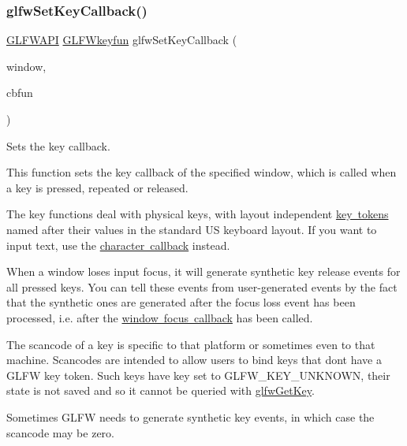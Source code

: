 \subsubsection{\texorpdfstring{glfwSetKeyCallback()}{glfwSetKeyCallback()}}
{\footnotesize\ttfamily \mbox{\hyperlink{glfw3_8h_a56da5036b2cc259351ae22fd6439bb47}{G\+L\+F\+W\+A\+PI}} \mbox{\hyperlink{group__input_ga0192a232a41e4e82948217c8ba94fdfd}{G\+L\+F\+Wkeyfun}} glfw\+Set\+Key\+Callback (\begin{DoxyParamCaption}\item[{\mbox{\hyperlink{group__window_ga3c96d80d363e67d13a41b5d1821f3242}{G\+L\+F\+Wwindow}} $\ast$}]{window,  }\item[{\mbox{\hyperlink{group__input_ga0192a232a41e4e82948217c8ba94fdfd}{G\+L\+F\+Wkeyfun}}}]{cbfun }\end{DoxyParamCaption})}



Sets the key callback. 

This function sets the key callback of the specified window, which is called when a key is pressed, repeated or released.

The key functions deal with physical keys, with layout independent \mbox{\hyperlink{group__keys}{key tokens}} named after their values in the standard US keyboard layout. If you want to input text, use the \mbox{\hyperlink{group__input_ga07b2959b23dc3e466ce7475746021002}{character callback}} instead.

When a window loses input focus, it will generate synthetic key release events for all pressed keys. You can tell these events from user-\/generated events by the fact that the synthetic ones are generated after the focus loss event has been processed, i.\+e. after the \mbox{\hyperlink{group__window_gac89c6534ba7fbab6f6c68b855656c0d4}{window focus callback}} has been called.

The scancode of a key is specific to that platform or sometimes even to that machine. Scancodes are intended to allow users to bind keys that don\textquotesingle{}t have a G\+L\+FW key token. Such keys have {\ttfamily key} set to {\ttfamily G\+L\+F\+W\+\_\+\+K\+E\+Y\+\_\+\+U\+N\+K\+N\+O\+WN}, their state is not saved and so it cannot be queried with \mbox{\hyperlink{group__input_ga7d8ad8ffaf272808f04e1d5d33ec8859}{glfw\+Get\+Key}}.

Sometimes G\+L\+FW needs to generate synthetic key events, in which case the scancode may be zero.


